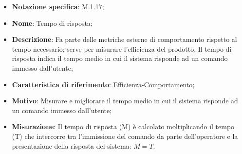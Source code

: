 \begin{itemize}
    \item \textbf{Notazione specifica}: M.1.17;
    \item \textbf{Nome}: Tempo di risposta;
    \item \textbf{Descrizione}: Fa parte delle metriche esterne di comportamento rispetto al tempo necessario; serve per misurare l’efficienza del prodotto. Il tempo di risposta indica il tempo medio in cui il sistema risponde ad un comando immesso dall’utente;
    \item \textbf{Caratteristica di riferimento}: Efficienza-Comportamento;
    \item \textbf{Motivo}: Misurare e migliorare il tempo medio in cui il sistema risponde ad un comando immesso dall’utente;
    \item \textbf{Misurazione}: Il tempo di risposta (M) è calcolato moltiplicando il tempo (T) che intercorre tra l’immissione del comando da parte dell’operatore e la presentazione della risposta del sistema: \( M = T \).
\end{itemize}
